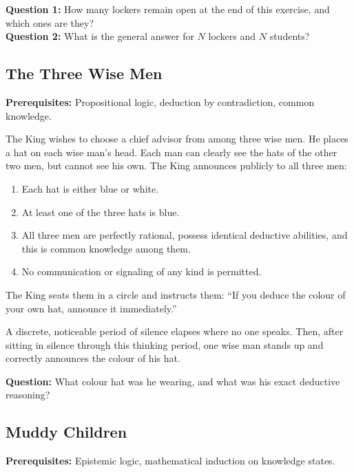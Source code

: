 \documentclass[12pt]{article}
\begin{document}
\textbf{Question 1:} How many lockers remain open at the end of this exercise, and which ones are they? \\
\textbf{Question 2:} What is the general answer for $N$ lockers and $N$ students?

\subsection{The Three Wise Men}
\textbf{Prerequisites:} Propositional logic, deduction by contradiction, common knowledge.

The King wishes to choose a chief advisor from among three wise men. He places a hat on each wise man's head. Each man can clearly see the hats of the other two men, but cannot see his own. The King announces publicly to all three men:
\begin{enumerate}[label=(\roman*)]
    \item Each hat is either blue or white.
    \item At least one of the three hats is blue.
    \item All three men are perfectly rational, possess identical deductive abilities, and this is common knowledge among them.
    \item No communication or signaling of any kind is permitted.
\end{enumerate}
The King seats them in a circle and instructs them: ``If you deduce the colour of your own hat, announce it immediately.''

A discrete, noticeable period of silence elapses where no one speaks. Then, after sitting in silence through this thinking period, one wise man stands up and correctly announces the colour of his hat.

\textbf{Question:} What colour hat was he wearing, and what was his exact deductive reasoning?

\subsection{Muddy Children}
\textbf{Prerequisites:} Epistemic logic, mathematical induction on knowledge states.
\end{document}
